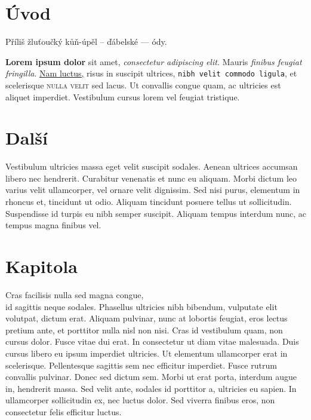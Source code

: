 \documentclass{article}
\begin{document}
	
	
	\section*{Úvod}
	
	Příliš žluťoučký kůň-úpěl -- ďábelské --- ódy.
	
	\textbf{Lorem ipsum dolor} sit amet, \textit{consectetur adipiscing elit.} Mauris \emph{finibus feugiat fringilla}. \underline{Nam luctus,} risus in suscipit ultrices, \texttt{nibh velit commodo ligula}, et scelerisque \textsc{nulla velit} sed lacus. Ut convallis congue quam, ac ultricies est aliquet imperdiet. Vestibulum cursus lorem vel feugiat tristique.
	
	\section{Další}
	
	 Vestibulum ultricies massa eget velit suscipit sodales. Aenean ultrices accumsan libero nec hendrerit. Curabitur venenatis et nunc eu aliquam. Morbi dictum leo varius velit ullamcorper, vel ornare velit dignissim. Sed nisi purus, elementum in rhoncus et, tincidunt ut odio. Aliquam tincidunt posuere tellus ut sollicitudin. Suspendisse id turpis eu nibh semper suscipit. Aliquam tempus interdum nunc, ac tempus magna finibus vel.
	
	\clearpage
	
	\section{Kapitola}
	
	\vspace*{5em}Cras facilisis nulla sed magna congue,\\ \vspace{5em}id sagittis neque sodales. \hspace{3em} Phasellus ultricies nibh bibendum, vulputate elit volutpat, dictum erat. Aliquam pulvinar, nunc at lobortis feugiat, eros lectus pretium ante, et porttitor nulla nisl non nisi. Cras id vestibulum quam, non cursus dolor. Fusce vitae dui erat. In consectetur ut diam vitae malesuada. Duis cursus libero eu ipsum imperdiet ultricies. Ut elementum ullamcorper erat in scelerisque. Pellentesque sagittis sem nec efficitur imperdiet. Fusce rutrum convallis pulvinar. Donec sed dictum sem. Morbi ut erat porta, interdum augue in, hendrerit massa. Sed velit ante, sodales id porttitor a, ultricies eu sapien. In ullamcorper sollicitudin ex, nec luctus dolor. Sed viverra finibus eros, non consectetur felis efficitur luctus.
	
\end{document}
